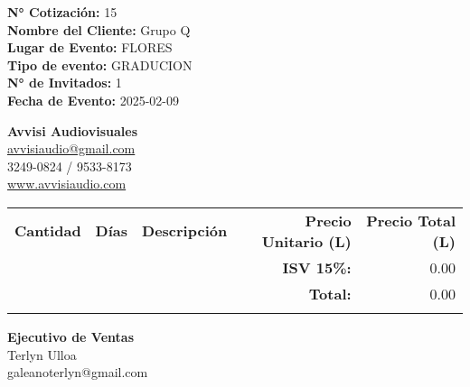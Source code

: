 \documentclass[a4paper,12pt]{article}
\begin{document}
\vspace*{1.5cm}
\noindent

\noindent
\textbf{N° Cotización:} 15 \\
\textbf{Nombre del Cliente:} Grupo Q\\
\textbf{Lugar de Evento:} FLORES \\
\textbf{Tipo de evento:} GRADUCION \\
\textbf{N° de Invitados:} 1\\
\textbf{Fecha de Evento:} 2025{-}02{-}09
\begin{flushright}
\vspace{-3.5cm}
\textbf{Avvisi Audiovisuales}\\
\href{mailto:avvisiaudio@gmail.com}{avvisiaudio@gmail.com} \\
3249-0824 / 9533-8173 \\
\href{https://avvisiaudio.com}{www.avvisiaudio.com} 
\end{flushright}
\vspace{1cm}


\noindent 
\begin{table}[h!]
    \centering
    \renewcommand{\arraystretch}{1.3} %
    \begin{tabular}{
            l
            c
            p{12cm}
            r
            r
        }
        \arrayrulecolor{primary}\hline
        \textbf{Cantidad} & \textbf{Días} & \textbf{Descripción} & \textbf{Precio Unitario (L)} & \textbf{Precio Total (L)} \\
        \arrayrulecolor{primary}\hline

        \arrayrulecolor{primary}\hline
        & & & \textbf{ISV 15\%:} & 0.00 \\
        & & & \textbf{Total:} & \multicolumn{1}{r}{0.00} \\
        \arrayrulecolor{primary}
    \end{tabular}
    \label{tab-productos-cotizados}
\end{table}

\vspace{0.4cm}
\noindent\begin{minipage}[t]{0.6\textwidth}
    \textbf{Ejecutivo de Ventas} \\
    \textbf{} Terlyn Ulloa\\
    \textbf{} galeanoterlyn@gmail.com\\
\end{minipage}%
\end{document}
